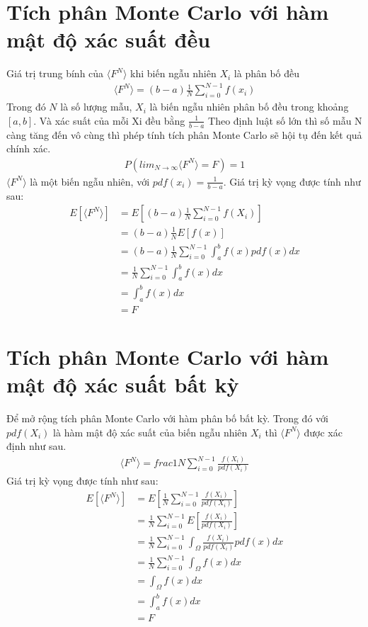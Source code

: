 \section{Tích phân Monte Carlo với hàm mật độ xác suất đều}\label{sec:2.2}
Giá trị trung bính của $\langle{F^N}\rangle$ khi biến ngẫu nhiên $X_i$ là phân bố đều
\begin{align}
	\langle{F^N}\rangle=(b-a)\frac{1}{N}\sum_{i=0}^{N-1}{f(x_i)}
\end{align}
Trong đó $N$ là số lượng mẫu, $X_i$ là biến ngẫu nhiên phân bố đều trong khoảng $[a,b]$. Và xác suất của mỗi Xi đều bằng $\frac{1}{b-a}$
Theo định luật số lớn thì số mẫu N càng tăng đến vô cùng thì phép tính tích phân Monte Carlo sẽ hội tụ đến kết quả chính xác.
\begin{align}
	P(lim_{N\rightarrow\infty}{\langle{F^N}\rangle}=F)=1
\end{align}
$\langle{F^N}\rangle$ là một biến ngẫu nhiên, với $pdf(x_i)=\frac{1}{b-a}$. Giá trị kỳ vọng được tính như sau:
\begin{equation} 
	\begin{split}
		{E}[\langle{F^N}\rangle] & = {E}\left[{(b-a)\frac{1}{N}\sum_{i=0}^{N-1}{f(X_i)}}\right]\\
										 & = (b-a)\frac{1}{N}{E}[f(x)]\\
										 & = (b-a)\frac{1}{N}\sum_{i=0}^{N-1}\int_a^b{f(x)pdf(x)dx}\\
										 & = \frac{1}{N}\sum_{i=0}^{N-1}\int_a^b{f(x)dx}\\
										 & = \int_a^b{f(x)dx}\\
										 & = F
	\end{split}
\end{equation}	
\section{Tích phân Monte Carlo với hàm mật độ xác suất bất kỳ}\label{sec:2.3}
Để mở rộng tích phân Monte Carlo với hàm phân bố bất kỳ. Trong đó với $pdf(X_i)$ là hàm mật độ xác suất của biến ngẫu nhiên $X_i$  thì $\langle{F^N}\rangle$ được xác định như sau.
\begin{align}
	\langle{F^N}\rangle=frac{1}{N}\sum_{i=0}^{N-1}{\frac{f(X_i)}{pdf(X_i)}}
\end{align}
Giá trị kỳ vọng được tính như sau:
\begin{equation} 
	\begin{split}
		{E}[\langle{F^N}\rangle] & = {E}\left[{\frac{1}{N}\sum_{i=0}^{N-1}\frac{{f(X_i)}}{pdf(X_i)}}\right] \\
										 & = \frac{1}{N}\sum_{i=0}^{N-1}{E}\left[\frac{{f(X_i)}}{pdf(X_i)}\right]\\
										 & = \frac{1}{N}\sum_{i=0}^{N-1}\int_\Omega{\frac{{f(X_i)}}{pdf(X_i)}}{pdf(x)dx}\\
										 & = \frac{1}{N}\sum_{i=0}^{N-1}\int_\Omega{f(x)dx}\\
										 & = \int_\Omega{f(x)dx}\\
										 & = \int_a^b{f(x)dx}\\
										 & = F
\end{split}
\end{equation}
